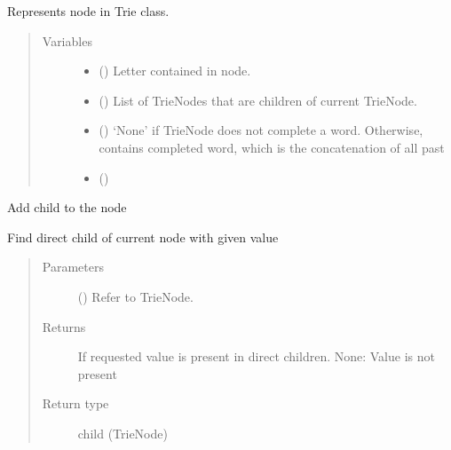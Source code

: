 \documentclass[letterpaper,10pt,english]{sphinxmanual}
\begin{document}
\begin{fulllineitems}
Represents node in Trie class.
\begin{quote}\begin{description}
\item[{Variables}] \leavevmode\begin{itemize}
\item {} 
 () \textendash{} Letter contained in node.

\item {} 
 () \textendash{} List of TrieNodes that are children of current TrieNode.

\item {} 
 () \textendash{} ‘None’ if TrieNode does not complete a word.
Otherwise, contains completed word, which is the concatenation of all past

\item {} 
 () \textendash{} 

\end{itemize}

\end{description}\end{quote}


\begin{fulllineitems}
Add child to the node

\end{fulllineitems}



\begin{fulllineitems}
Find direct child of current node with given value
\begin{quote}\begin{description}
\item[{Parameters}] \leavevmode
{} () \textendash{} Refer to TrieNode.

\item[{Returns}] \leavevmode
If requested value is present in direct children.
None: Value is not present

\item[{Return type}] \leavevmode
child (TrieNode)

\end{description}\end{quote}

\end{fulllineitems}


\end{fulllineitems}
\end{document}
